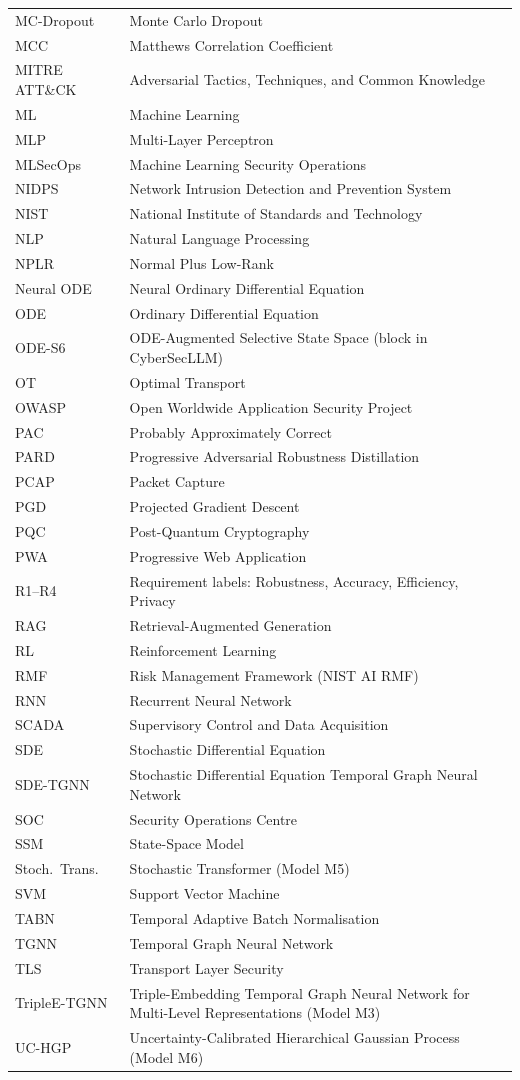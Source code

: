 \begin{longtable}{@{}p{3.8cm} p{10cm}@{}}
MC-Dropout & Monte Carlo Dropout \\
MCC & Matthews Correlation Coefficient \\
MITRE ATT\&CK & Adversarial Tactics, Techniques, and Common Knowledge \\
ML & Machine Learning \\
MLP & Multi-Layer Perceptron \\
MLSecOps & Machine Learning Security Operations \\
NIDPS & Network Intrusion Detection and Prevention System \\
NIST & National Institute of Standards and Technology \\
NLP & Natural Language Processing \\
NPLR & Normal Plus Low-Rank \\
Neural ODE & Neural Ordinary Differential Equation \\
ODE & Ordinary Differential Equation \\
ODE-S6 & ODE-Augmented Selective State Space (block in CyberSecLLM) \\
OT & Optimal Transport \\
OWASP & Open Worldwide Application Security Project \\
PAC & Probably Approximately Correct \\
PARD & Progressive Adversarial Robustness Distillation \\
PCAP & Packet Capture \\
PGD & Projected Gradient Descent \\
PQC & Post-Quantum Cryptography \\
PWA & Progressive Web Application \\
R1--R4 & Requirement labels: Robustness, Accuracy, Efficiency, Privacy \\
RAG & Retrieval-Augmented Generation \\
RL & Reinforcement Learning \\
RMF & Risk Management Framework (NIST AI RMF) \\
RNN & Recurrent Neural Network \\
SCADA & Supervisory Control and Data Acquisition \\
SDE & Stochastic Differential Equation \\
SDE-TGNN & Stochastic Differential Equation Temporal Graph Neural Network \\
SOC & Security Operations Centre \\
SSM & State-Space Model \\
Stoch.\ Trans. & Stochastic Transformer (Model M5) \\
SVM & Support Vector Machine \\
TABN & Temporal Adaptive Batch Normalisation \\
TGNN & Temporal Graph Neural Network \\
TLS & Transport Layer Security \\
TripleE-TGNN & Triple-Embedding Temporal Graph Neural Network for Multi-Level Representations (Model M3) \\
UC-HGP & Uncertainty-Calibrated Hierarchical Gaussian Process (Model M6) \\
\end{longtable}
